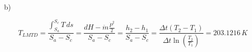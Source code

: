 b) 

\[
T_{LMTD} = \frac{\int_{S_a}^{S_c} T \, ds}{S_a - S_c} = \frac{dH - \dot{m} \frac{\dot{P}^2}{2}}{S_a - S_c} = \frac{h_2 - h_1}{S_a - S_c} = \frac{\Delta t (T_2 - T_1)}{\Delta t \ln \left( \frac{T_2}{T_1} \right)} = 203.1216 \, K
\]